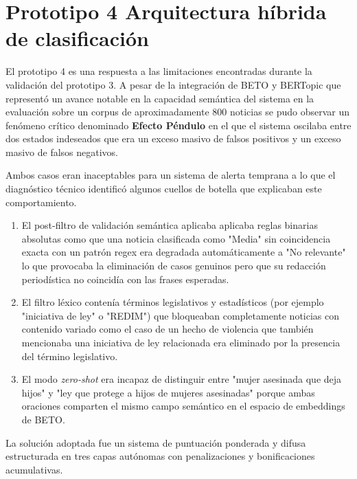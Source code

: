 \clearpage
\section{Prototipo 4 Arquitectura híbrida de clasificación}
\label{sec:tt2_prototipo4}

El prototipo 4 es una respuesta a las limitaciones encontradas durante la validación 
del prototipo 3. A pesar de la integración de BETO y BERTopic que representó un avance
notable en la capacidad semántica del sistema en la evaluación sobre un corpus de 
aproximadamente 800 noticias se pudo observar un fenómeno crítico denominado
\textbf{Efecto Péndulo} en el que el sistema oscilaba entre dos estados indeseados
que era un exceso masivo de falsos positivos y un exceso masivo de falsos negativos.

Ambos casos eran inaceptables para un sistema de alerta temprana a lo que el diagnóstico técnico 
identificó algunos cuellos de botella que explicaban este comportamiento.
 \begin{enumerate}
    \item El post-filtro de validación semántica aplicaba aplicaba reglas binarias absolutas
          como que una noticia clasificada como "Media" sin coincidencia exacta con un
          patrón regex era degradada automáticamente a "No relevante" lo que provocaba la
          eliminación de casos genuinos pero que su redacción periodística no coincidía con
          las frases esperadas.

    \item El filtro léxico contenía términos legislativos y estadísticos
          (por ejemplo "iniciativa de ley" o "REDIM") que bloqueaban
          completamente noticias con contenido variado como el caso de un
          hecho de violencia que también mencionaba una iniciativa de ley
          relacionada era eliminado por la presencia del término legislativo.

    \item El modo \textit{zero-shot} era incapaz de distinguir
          entre "mujer asesinada que deja hijos" y "ley que protege a hijos de
          mujeres asesinadas" porque ambas oraciones comparten el mismo campo
          semántico en el espacio de embeddings de BETO.
\end{enumerate}

La solución adoptada fue un sistema de puntuación ponderada y difusa estructurada
en tres capas autónomas con penalizaciones y bonificaciones acumulativas.

